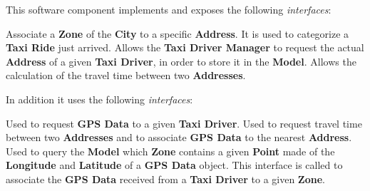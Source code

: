 \begin{itemize}
\begin{itemize}
		This software component implements and exposes the following \textit{interfaces}:
		\begin{itemize}
			 Associate a \textbf{Zone} of the \textbf{City} to a specific \textbf{Address}. It is used to categorize a \textbf{Taxi Ride} just arrived.
			 Allows the \textbf{Taxi Driver Manager} to request the actual \textbf{Address} of a given \textbf{Taxi Driver}, in order to store it in the \textbf{Model}.
			 Allows the calculation of the travel time between two \textbf{Addresses}.
		\end{itemize}
		In addition it uses the following \textit{interfaces}:
		\begin{itemize}
			 Used to request \textbf{GPS Data} to a given \textbf{Taxi Driver}.
			 Used to request travel time between two \textbf{Addresses} and to associate \textbf{GPS Data} to the nearest \textbf{Address}.
			 Used to query the \textbf{Model} which \textbf{Zone} contains a given \textbf{Point} made of the \textbf{Longitude} and \textbf{Latitude} of a \textbf{GPS Data} object.
			This interface is called to associate the \textbf{GPS Data} received from a \textbf{Taxi Driver} to a given \textbf{Zone}.
		\end{itemize}
		

\end{itemize}
\end{itemize}
